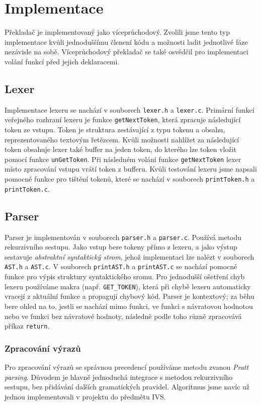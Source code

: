 \section{Implementace}
Překladač je implementovaný jako víceprůchodový.
Zvolili jsme tento typ implementace kvůli jednoduššímu členení kódu a možnosti ladit jednotlivé fáze nezávisle na sobě.
Víceprůchodový překladač se také osvědčil pro implementaci volání funkcí před jejich deklaracemi.

\subsection{Lexer}
Implementace lexeru se nachází v souborech \texttt{lexer.h} a \texttt{lexer.c}.
Primární funkcí veřejného rozhraní lexeru je funkce \texttt{getNextToken},
která zpracuje následující token ze vstupu.
Token je struktura zestávající z typu tokenu a obsahu, reprezentovaného textovým řetězcem.
Kvůli možnosti nahlížet za následující token obsahuje lexer také buffer na jeden token,
do kterého lze token vložit pomocí funkce \texttt{unGetToken}.
Při následném volání funkce \texttt{getNextToken} lexer místo zpracování vstupu vrátí token z bufferu.
Kvůli testování lexeru jsme napsali pomocné funkce pro tištění tokenů,
které se nachází v souborech \texttt{printToken.h} a \texttt{printToken.c}.

\subsection{Parser}
Parser je implementován v souborech \texttt{parser.h} a \texttt{parser.c}.
Používá metodu rekurzivního sestupu.
Jako vstup bere tokeny přímo z lexeru, a jako výstup sestavuje \textit{abstraktní syntaktický strom},
jehož implementaci lze nalézt v souborech \texttt{AST.h} a \texttt{AST.c}.
V souborech \texttt{printAST.h} a \texttt{printAST.c} se nachází pomocné funkce pro výpis struktury syntaktického sromu.
Pro jednodušší ošetření chyb lexeru používáme makra (např. \texttt{GET\_TOKEN}),
která při chybě lexeru automaticky vracejí z aktuální funkce a propagují chybový kód.
Parser je kontextový; za běhu bere ohled na to, jestli se nachází mimo funkci,
ve funkci s návratovou hodnotou nebo ve funkci bez návratové hodnoty,
následně podle toho různě zpracovává příkaz \texttt{return}.

\subsubsection{Zpracování výrazů}
Pro zpracování výrazů se správnou precedencí používáme metodu zvanou \textit{Pratt parsing}.
Důvodem je hlavně jednoduchá integrace s metodou rekurzivního sestupu, bez přidávání dalších gramatických pravidel.
Algoritmus jsme navíc už jednou implementovali v projektu do předmětu IVS.

